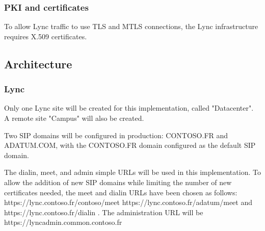	\subsubsection{PKI and certificates}
		To allow Lync traffic to use TLS and MTLS connections, the Lync infrastructure requires X.509 certificates.		
		
		


\subsection{Architecture}

	\subsubsection{Lync}
	Only one Lync site will be created for this implementation, called "Datacenter". A remote site "Campus" will also be created.
	
	Two SIP domains will be configured in production: CONTOSO.FR and ADATUM.COM, with the CONTOSO.FR domain configured as the default SIP domain.
	
	The dialin, meet, and admin simple URLs will be used in this implementation. To allow the addition of new SIP domains while limiting the number of new certificates needed, the meet and dialin URLs have been chosen as follows: https://lync.contoso.fr/contoso/meet https://lync.contoso.fr/adatum/meet and \linebreak https://lync.contoso.fr/dialin .
	The administration URL will be \linebreak https://lyncadmin.common.contoso.fr
	
	
